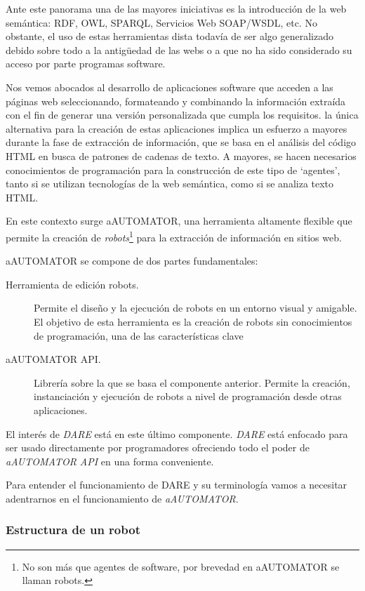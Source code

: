 Ante este panorama una de las mayores iniciativas es la introducción
de la web semántica: RDF, OWL, SPARQL, Servicios Web SOAP/WSDL,
etc. No obstante, el uso de estas herramientas dista todavía de
ser algo generalizado debido sobre todo a la antigüedad de las webs o
a que no ha sido considerado su acceso por parte programas software.

Nos vemos abocados al desarrollo de aplicaciones software que acceden
a las páginas web seleccionando, formateando y combinando la
información extraída con el fin de generar una versión personalizada
que cumpla los requisitos. la única alternativa para la creación de
estas aplicaciones implica un esfuerzo a mayores durante la fase de
extracción de información, que se basa en el análisis del código HTML
en busca de patrones de cadenas de texto. A mayores, se hacen
necesarios conocimientos de programación para la construcción de este
tipo de `agentes', tanto si se utilizan tecnologías de la web
semántica, como si se analiza texto HTML.

En este contexto surge aAUTOMATOR, una herramienta altamente flexible
que permite la creación de \emph{robots}\footnote{No son más que
  agentes de software, por brevedad en aAUTOMATOR se llaman robots.}
para la extracción de información en sitios web.

aAUTOMATOR se compone de dos partes fundamentales:
\begin{description}
\item[Herramienta de edición robots.] Permite el diseño y la ejecución
  de robots en un entorno visual y amigable. El objetivo de esta
  herramienta es la creación de robots sin conocimientos de
  programación, una de las características clave

\item[aAUTOMATOR API.] Librería sobre la que se basa el componente
  anterior. Permite la creación, instanciación y ejecución de robots a
  nivel de programación desde otras aplicaciones.
\end{description}

El interés de \emph{DARE} está en este último componente. \emph{DARE} está
enfocado para ser usado directamente por programadores ofreciendo todo
el poder de \emph{aAUTOMATOR API} en una forma conveniente.

Para entender el funcionamiento de DARE y su terminología vamos a
necesitar adentrarnos en el funcionamiento de \emph{aAUTOMATOR}.

\subsubsection{Estructura de un robot}

